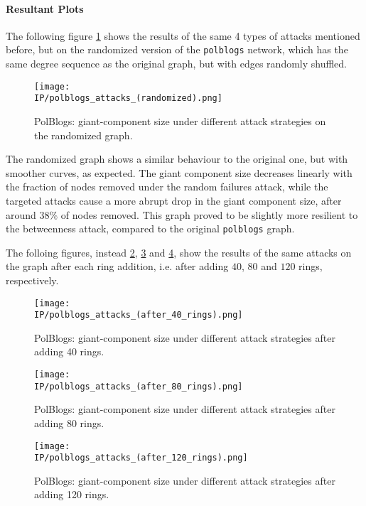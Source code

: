 \documentclass{article}
\newcommand{\IP}{../results}
\begin{document}
\paragraph{Resultant Plots}
The following figure \ref{fig:polblogs_randomized} shows the results of the same 4 types of attacks mentioned before, but on the randomized version of the \texttt{polblogs} network, which has the same degree sequence as the original graph, but with edges randomly shuffled.

\begin{figure}[H]
  \centering
  \texttt{[image: \\IP/polblogs\_attacks\_(randomized).png]}
  \caption{PolBlogs: giant-component size under different attack strategies on the randomized graph.}
  \label{fig:polblogs_randomized}
\end{figure}

The randomized graph shows a similar behaviour to the original one, but with smoother curves, as expected.
The giant component size decreases linearly with the fraction of nodes removed under the random failures attack, while the targeted attacks cause a more abrupt drop in the giant component size, after around $38\%$ of nodes removed. This graph proved to be slightly more resilient to the betweenness attack, compared to the original \texttt{polblogs} graph.

The folloing figures, instead \ref{fig:polblogs_ring1}, \ref{fig:polblogs_ring2} and \ref{fig:polblogs_ring3}, show the results of the same attacks on the graph after each ring addition, i.e. after adding $40$, $80$ and $120$ rings, respectively.

\begin{figure}[H]
  \centering
  \texttt{[image: \\IP/polblogs\_attacks\_(after\_40\_rings).png]}
  \caption{PolBlogs: giant-component size under different attack strategies after adding 40 rings.}
  \label{fig:polblogs_ring1}
\end{figure}
\begin{figure}[H]
  \centering
  \texttt{[image: \\IP/polblogs\_attacks\_(after\_80\_rings).png]}
  \caption{PolBlogs: giant-component size under different attack strategies after adding 80 rings.}
  \label{fig:polblogs_ring2}
\end{figure}
\begin{figure}[H]
  \centering
  \texttt{[image: \\IP/polblogs\_attacks\_(after\_120\_rings).png]}
  \caption{PolBlogs: giant-component size under different attack strategies after adding 120 rings.}
  \label{fig:polblogs_ring3}
\end{figure}
\end{document}
